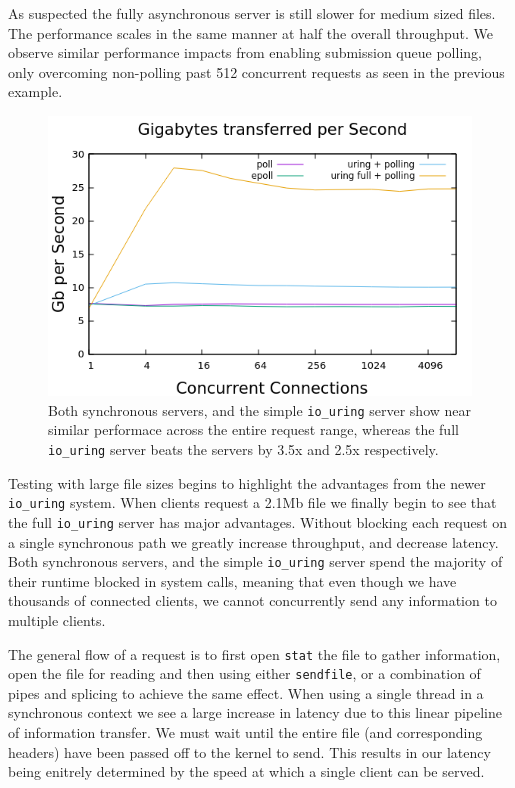 \documentclass[conference]{IEEEtran}{article}
\begin{document}
As suspected the fully asynchronous server is still slower for medium sized files. The performance scales in the same manner at half the overall throughput. We observe similar performance impacts from enabling submission queue polling, only overcoming non-polling past 512 concurrent requests as seen in the previous example.

\begin{figure}
\centering
\includegraphics[width=4.5in]{gbps.png}
\caption{Both synchronous servers, and the simple \texttt{io\_uring} server show near similar performace across the entire request range, whereas the full \texttt{io\_uring} server beats the servers by 3.5x and 2.5x respectively.}
\end{figure}

Testing with large file sizes begins to highlight the advantages from the newer \texttt{io\_uring} system. When clients request a 2.1Mb file we finally begin to see that the full \texttt{io\_uring} server has major advantages. Without blocking each request on a single synchronous path we greatly increase throughput, and decrease latency. Both synchronous servers, and the simple \texttt{io\_uring} server spend the majority of their runtime blocked in system calls, meaning that even though we have thousands of connected clients, we cannot concurrently send any information to multiple clients.

The general flow of a request is to first open \texttt{stat} the file to gather information, open the file for reading and then using either \texttt{sendfile}, or a combination of pipes and splicing to achieve the same effect. When using a single thread in a synchronous context we see a large increase in latency due to this linear pipeline of information transfer. We must wait until the entire file (and corresponding headers) have been passed off to the kernel to send. This results in our latency being enitrely determined by the speed at which a single client can be served.
\end{document}
